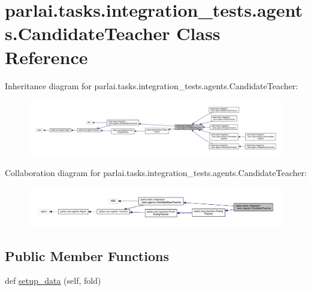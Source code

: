 \hypertarget{classparlai_1_1tasks_1_1integration__tests_1_1agents_1_1CandidateTeacher}{}\section{parlai.\+tasks.\+integration\+\_\+tests.\+agents.\+Candidate\+Teacher Class Reference}
\label{classparlai_1_1tasks_1_1integration__tests_1_1agents_1_1CandidateTeacher}


Inheritance diagram for parlai.\+tasks.\+integration\+\_\+tests.\+agents.\+Candidate\+Teacher\+:\nopagebreak
\begin{figure}[H]
\begin{center}
\leavevmode
\includegraphics[width=350pt]{d4/d48/classparlai_1_1tasks_1_1integration__tests_1_1agents_1_1CandidateTeacher__inherit__graph}
\end{center}
\end{figure}


Collaboration diagram for parlai.\+tasks.\+integration\+\_\+tests.\+agents.\+Candidate\+Teacher\+:\nopagebreak
\begin{figure}[H]
\begin{center}
\leavevmode
\includegraphics[width=350pt]{d9/d03/classparlai_1_1tasks_1_1integration__tests_1_1agents_1_1CandidateTeacher__coll__graph}
\end{center}
\end{figure}
\subsection*{Public Member Functions}
\begin{DoxyCompactItemize}
\item 
def \hyperlink{classparlai_1_1tasks_1_1integration__tests_1_1agents_1_1CandidateTeacher_a9dafcc2731525aa45337b2d6816ad9a6}{setup\+\_\+data} (self, fold)
\end{DoxyCompactItemize}
